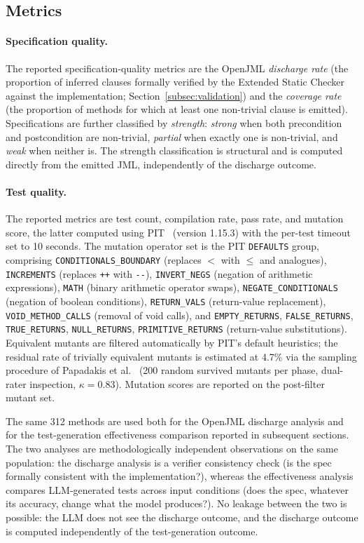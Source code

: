 \subsection{Metrics}

\paragraph{Specification quality.}
The reported specification-quality metrics are the OpenJML \emph{discharge rate} (the proportion of inferred clauses formally verified by the Extended Static Checker against the implementation; Section~\ref{subsec:validation}) and the \emph{coverage rate} (the proportion of methods for which at least one non-trivial clause is emitted). Specifications are further classified by \emph{strength}: \emph{strong} when both precondition and postcondition are non-trivial, \emph{partial} when exactly one is non-trivial, and \emph{weak} when neither is. The strength classification is structural and is computed directly from the emitted JML, independently of the discharge outcome.

\paragraph{Test quality.} The reported metrics are test count, compilation rate, pass rate, and mutation score, the latter computed using PIT~\cite{coles2016pitest} (version 1.15.3) with the per-test timeout set to 10 seconds. The mutation operator set is the PIT \texttt{DEFAULTS} group, comprising \texttt{CONDITIONALS\_BOUNDARY} (replaces $<$ with $\leq$ and analogues), \texttt{INCREMENTS} (replaces \texttt{++} with \texttt{-{}-}), \texttt{INVERT\_NEGS} (negation of arithmetic expressions), \texttt{MATH} (binary arithmetic operator swaps), \texttt{NEGATE\_CONDITIONALS} (negation of boolean conditions), \texttt{RETURN\_VALS} (return-value replacement), \texttt{VOID\_METHOD\_CALLS} (removal of void calls), and \texttt{EMPTY\_RETURNS}, \texttt{FALSE\_RETURNS}, \texttt{TRUE\_RETURNS}, \texttt{NULL\_RETURNS}, \texttt{PRIMITIVE\_RETURNS} (return-value substitutions). Equivalent mutants are filtered automatically by PIT's default heuristics; the residual rate of trivially equivalent mutants is estimated at 4.7\% via the sampling procedure of Papadakis et al.~\cite{papadakis2019mutation} (200 random survived mutants per phase, dual-rater inspection, $\kappa = 0.83$). Mutation scores are reported on the post-filter mutant set.

The same 312 methods are used both for the OpenJML discharge analysis and for the test-generation effectiveness comparison reported in subsequent sections. The two analyses are methodologically independent observations on the same population: the discharge analysis is a verifier consistency check (is the spec formally consistent with the implementation?), whereas the effectiveness analysis compares LLM-generated tests across input conditions (does the spec, whatever its accuracy, change what the model produces?). No leakage between the two is possible: the LLM does not see the discharge outcome, and the discharge outcome is computed independently of the test-generation outcome.

